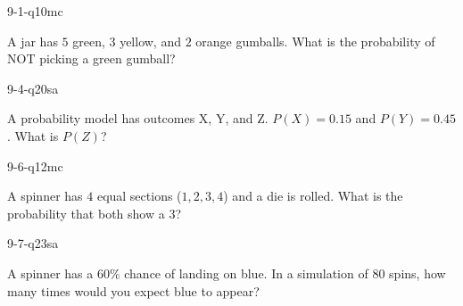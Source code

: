 \begin{practiceQuestion}{9-1-q10}{mc}
\begin{questionText}
A jar has $5$ green, $3$ yellow, and $2$ orange gumballs. What is the probability of NOT picking a green gumball?
\end{questionText}
\end{practiceQuestion}

\begin{practiceQuestion}{9-4-q20}{sa}
\begin{questionText}
A probability model has outcomes X, Y, and Z. $P(X) = 0.15$ and $P(Y) = 0.45$. What is $P(Z)$?
\end{questionText}
\end{practiceQuestion}

\begin{practiceQuestion}{9-6-q12}{mc}
\begin{questionText}
A spinner has $4$ equal sections ($1, 2, 3, 4$) and a die is rolled. What is the probability that both show a $3$?
\end{questionText}
\end{practiceQuestion}

\begin{practiceQuestion}{9-7-q23}{sa}
\begin{questionText}
A spinner has a $60\%$ chance of landing on blue. In a simulation of $80$ spins, how many times would you expect blue to appear?
\end{questionText}
\end{practiceQuestion}
